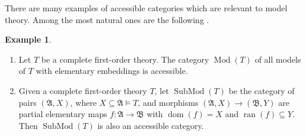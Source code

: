 \documentclass[a4paper]{amsart}
\theoremstyle{definition}
\newtheorem{example}[definition]{Example}
\theoremstyle{remark}
\newcommand{\A}{\mathcal{A}}
\newcommand{\B}{\mathcal{B}}
\DeclareMathOperator{\dom}{dom}
\DeclareMathOperator{\ran}{ran}
\theoremstyle{definition}
\renewcommand{\A}{\mathfrak{A}}
\renewcommand{\B}{\mathfrak{B}}
\DeclareMathOperator{\Mod}{Mod}
\DeclareMathOperator{\Sub}{SubMod}
\begin{document}
There are many examples of accessible categories which are relevant to model theory. Among the most natural ones are the following \parencite[Def. 2.2]{kamsma2020kim}.
\begin{example}\quad
    \begin{enumerate}
        \item Let $T$ be a complete first-order theory. The category $\Mod(T)$ of all models of $T$ with elementary embeddings is accessible.
        \item Given a complete first-order theory $T$, let $\Sub(T)$ be the category of pairs $(\A,X)$, where $X\subseteq\A\models T$, and morphisms $(\A,X)\to(\B,Y)$ are partial elementary maps $f\colon\A\to\B$ with $\dom(f) = X$ and $\ran(f)\subseteq Y$. Then $\Sub(T)$ is also an accessible category.
    \end{enumerate}
\end{example}
\end{document}
